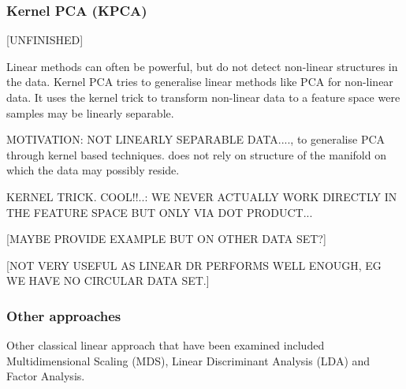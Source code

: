 
\hfill
\subsubsection{Kernel PCA (KPCA)}
[UNFINISHED]

Linear methods can often be powerful, but do not detect non-linear structures in the data.
Kernel PCA tries to generalise linear methods like PCA for non-linear data.
It uses the kernel trick to transform non-linear data to a feature space were samples may be linearly separable.

MOTIVATION: NOT LINEARLY SEPARABLE DATA...., to generalise PCA through kernel based techniques. does not rely on structure of the manifold on which the data may possibly reside. 

KERNEL TRICK. COOL!!..: WE NEVER ACTUALLY WORK DIRECTLY IN THE FEATURE SPACE BUT ONLY VIA DOT PRODUCT...


[MAYBE PROVIDE EXAMPLE BUT ON OTHER DATA SET?]

[NOT VERY USEFUL AS LINEAR DR PERFORMS WELL ENOUGH, EG WE HAVE NO CIRCULAR DATA SET.] 


\hfill
\subsubsection{Other approaches}

Other classical linear approach that have been examined included Multidimensional Scaling (MDS), Linear Discriminant Analysis (LDA) and Factor Analysis. 


